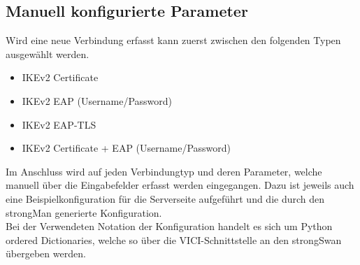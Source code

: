 \subsection{Manuell konfigurierte Parameter}
Wird eine neue Verbindung erfasst kann zuerst zwischen den folgenden Typen ausgewählt werden.
\begin{itemize}
    \item IKEv2 Certificate
    \item IKEv2 EAP (Username/Password)
    \item IKEv2 EAP-TLS
    \item IKEv2 Certificate + EAP (Username/Password)
\end{itemize}
Im Anschluss wird auf jeden Verbindungtyp und deren Parameter, welche manuell über die Eingabefelder erfasst werden eingegangen. Dazu ist jeweils auch eine Beispielkonfiguration für die Serverseite aufgeführt und die durch den strongMan generierte Konfiguration. \\
Bei der Verwendeten Notation der Konfiguration handelt es sich um Python ordered Dictionaries, welche so über die VICI-Schnittstelle an den strongSwan übergeben werden.\\

\newpage

